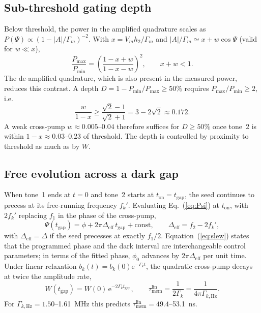 \documentclass[aps,prb,reprint,superscriptaddress,floatfix]{revtex4-2}
\newcommand{\ee}{\mathrm{e}}
\newcommand{\tgap}{t_{\mathrm{gap}}}
\newcommand{\Deff}{\Delta_{\mathrm{eff}}}
\begin{document}
\subsection{Sub-threshold gating depth}\label{sec:depth}

Below threshold, the power in the amplified quadrature scales as $P(\Psi)\propto(1-|A|/\Gamma_m)^{-2}$. With $x=V_mh_2/\Gamma_m$ and $|A|/\Gamma_m\simeq x+w\cos\Psi$ (valid for $w\ll x$),
\begin{equation}
\frac{P_{\max}}{P_{\min}}=\left(\frac{1-x+w}{1-x-w}\right)^{2},\qquad x+w<1 .
\label{eq:ratio}
\end{equation}
The de-amplified quadrature, which is also present in the measured power, reduces this contrast. A depth $D=1-P_{\min}/P_{\max}\ge50\%$ requires $P_{\max}/P_{\min}\ge2$, i.e.
\begin{equation}
\frac{w}{1-x}\ge\frac{\sqrt2-1}{\sqrt2+1}=3-2\sqrt2\approx0.172 .
\label{eq:criterion}
\end{equation}
A weak cross-pump $w\approx0.005$--$0.04$ therefore suffices for $D\ge50\%$ once tone~2 is within $1-x\approx0.03$--$0.23$ of threshold. The depth is controlled by proximity to threshold as much as by $W$.

\subsection{Free evolution across a dark gap}\label{sec:freeevol}

When tone~1 ends at $t=0$ and tone~2 starts at $t_{\mathrm{on}}=\tgap$, the seed continues to precess at its free-running frequency $f_k'$. Evaluating Eq.~(\ref{eq:Psi}) at $t_{\mathrm{on}}$, with $2f_k'$ replacing $f_1$ in the phase of the cross-pump,
\begin{equation}
\Psi(\tgap)=\phi+2\pi\Deff\,\tgap+\text{const},\qquad \Deff=f_2-2f_k' ,
\label{eq:slew}
\end{equation}
with $\Deff=\Delta$ if the seed precesses at exactly $f_1/2$. Equation~(\ref{eq:slew}) states that the programmed phase and the dark interval are interchangeable control parameters; in terms of the fitted phase, $\phi_0$ advances by $2\pi\Deff$ per unit time. Under linear relaxation $b_k(t)=b_k(0)\ee^{-\Gamma_kt}$, the quadratic cross-pump decays at twice the amplitude rate,
\begin{equation}
W(\tgap)=W(0)\,\ee^{-2\Gamma_k\tgap},\qquad\tau^{\mathrm{lin}}_{\mathrm{mem}}=\frac{1}{2\Gamma_k}=\frac{1}{4\pi\Gamma_{k,\mathrm{Hz}}} .
\label{eq:decay}
\end{equation}
For $\Gamma_{k,\mathrm{Hz}}=1.50$--\SI{1.61}{\mega\hertz} this predicts $\tau_{\mathrm{mem}}^{\mathrm{lin}}=49.4$--\SI{53.1}{\nano\second}.
\end{document}
